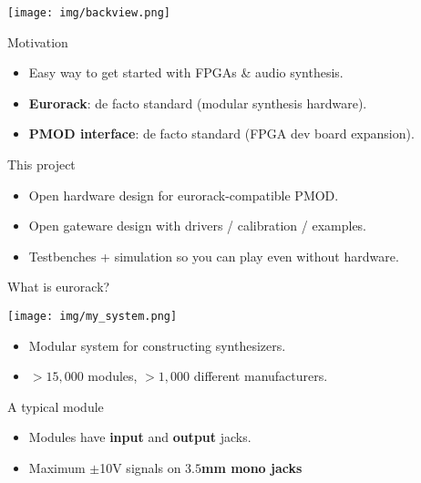 \documentclass[aspectratio=169]{beamer}
\begin{document}
\begin{frame}{}
    \begin{center}
        \texttt{[image: img/backview.png]}
    \end{center}
    \begin{block}{Motivation}
        \begin{itemize}
            \item Easy way to get started with FPGAs \& audio synthesis.
            \item \textbf{Eurorack}: de facto standard (modular synthesis hardware).
            \item \textbf{PMOD interface}: de facto standard (FPGA dev board expansion).
        \end{itemize}
    \end{block}
    \begin{block}{This project}
        \begin{itemize}
            \item Open hardware design for eurorack-compatible PMOD.
            \item Open gateware design with drivers / calibration / examples.
            \item Testbenches + simulation so you can play even without hardware.
        \end{itemize}
    \end{block}
\end{frame}

\begin{frame}{What is eurorack?}
    \begin{center}
        \texttt{[image: img/my\_system.png]}
    \end{center}
    \begin{itemize}
        \item Modular system for constructing synthesizers.
        \item $>15,000$ modules, $>1,000$ different manufacturers.
    \end{itemize}
\end{frame}

\begin{frame}{A typical module}
    \begin{figure}
       \centering
       \hspace{1cm}
    \end{figure}
    \begin{itemize}
        \item Modules have \textbf{input} and \textbf{output} jacks.
        \item Maximum $\pm$10V signals on \textbf{$3.5$mm mono jacks}
    \end{itemize}
\end{frame}
\end{document}

